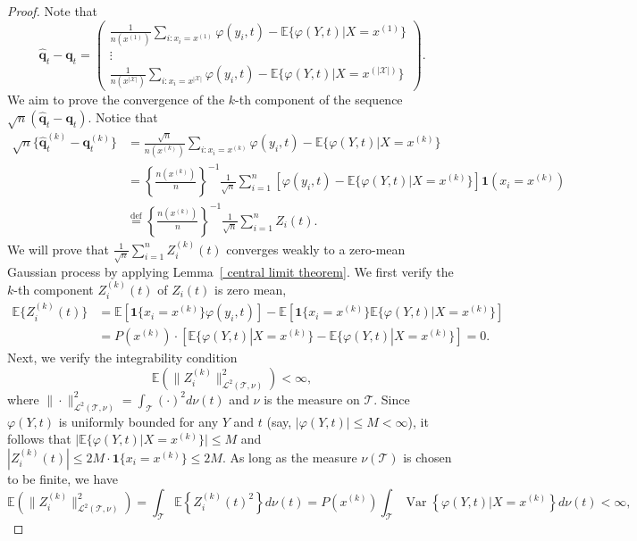 \documentclass[
  12pt]{article}
\def\q{\mathbf{q}}
\def\wh{\widehat}
\def\cL{\mathcal{L}}
\def\cT{\mathcal{T}}
\begin{document}
\begin{proof}
Note that
$$
\wh{\q}_t-\q_t=\left( \begin{array}{c}
	 \frac{1}{n(x^{(1)})} \sum_{i:x_i=x^{(1)}} \varphi(y_i,t)-\mathbb{E}\{\varphi(Y,t)|X=x^{(1)}\}\\
	\vdots\\
	\frac{1}{n(x^{|\mathcal{X}|})} \sum_{i:x_i=x^{|\mathcal{X}|}} \varphi(y_i,t)-\mathbb{E}\{\varphi(Y,t)|X=x^{(|\mathcal{X}|)}\}
\end{array} \right).
$$
We aim to prove the convergence of the $k$-th component of the sequence $\sqrt{n}(\wh{\mathbf{q}}_t - \mathbf{q}_t)$. Notice that
\begin{align*}
    \sqrt{n}\{\wh{\q}^{(k)}_t-\q^{(k)}_t\}&=\frac{\sqrt{n}}{n(x^{(k)})} \sum_{i:x_i=x^{(k)}} \varphi(y_i,t)-\mathbb{E}\{\varphi(Y,t)|X=x^{(k)}\}\\
    &=\left\{\frac{n(x^{(k)})}{n}\right\}^{-1}\frac{1}{\sqrt{n}} \sum_{i=1}^n \left[\varphi(y_i,t)-\mathbb{E}\{\varphi(Y,t)|X=x^{(k)}\}\right]\mathbf{1}(x_i=x^{(k)})\\
    & \overset{\mathrm{def}}{=} \left\{\frac{n(x^{(k)})}{n}\right\}^{-1}\frac{1}{\sqrt{n}} \sum_{i=1}^n Z_i(t).
\end{align*}
We will prove that $\frac{1}{\sqrt{n}} \sum_{i=1}^n Z_i^{(k)}(t)$ converges weakly to a zero-mean Gaussian process by applying Lemma~\ref{ central limit theorem}. We first verify the $k$-th component $Z_i^{(k)}(t)$ of $Z_i(t)$ is zero mean,
\begin{align*}
    \mathbb{E}\{Z_i^{(k)}(t)\} &= \mathbb{E}[\mathbf{1}\{x_i = x^{(k)}\} \varphi(y_i, t)]-\mathbb{E}[\mathbf{1}\{x_i = x^{(k)}\}\mathbb{E}\{\varphi(Y,t)|X=x^{(k)}\}] \\
    &= P(x^{(k)}) \cdot [\mathbb{E}\{\varphi(Y,t)|X=x^{(k)}\}-\mathbb{E}\{\varphi(Y,t)|X=x^{(k)}\}] = 0.
\end{align*}
Next, we verify the integrability condition
\begin{equation}
\label{eq.var-infinity_dis}
    \mathbb{E} \left( \| Z_i^{(k)} \|_{\cL^2(\cT, \nu)}^2 \right) <\infty, 
\end{equation}
where $\|\cdot\|_{\cL^2(\cT, \nu)}^2 = \int_{\cT} (\cdot)^2  d\nu(t)$ and $\nu$ is the measure on $\cT$. Since $\varphi(Y,t)$ is uniformly bounded for any $Y$ and $t$ (say, $|\varphi(Y,t)| \leq M < \infty$), it follows that $|\mathbb{E}\{\varphi(Y,t)|X=x^{(k)}\}| \leq M$ and $|Z_i^{(k)}(t)| \leq 2M \cdot \mathbf{1}\{x_i = x^{(k)}\} \leq 2M$. As long as the measure $\nu(\cT)$ is chosen to be finite, we have 
$$
\mathbb{E} \left( \|Z_i^{(k)}\|_{\cL^2(\cT, \nu)}^2 \right) = \int_{\cT} \mathbb{E}\left\{ Z_i^{(k)}(t)^2 \right\}  d\nu(t) = P(x^{(k)}) \int_{\cT} \operatorname{Var}\left\{ \varphi(Y, t) | X = x^{(k)} \right\}  d\nu(t) < \infty,
$$
\end{proof}
\end{document}

